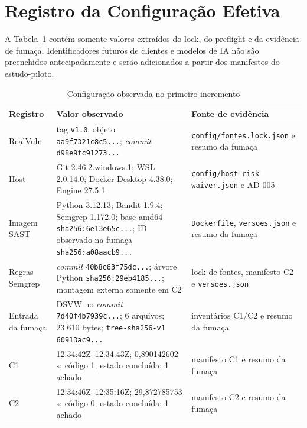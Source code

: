 \section{Registro da Configuração Efetiva}\label{sec:registro-configuracao-desenvolvimento}

A Tabela~\ref{tab:registro-configuracao-efetiva} contém somente valores extraídos do lock, do preflight e da evidência de fumaça. Identificadores futuros de clientes e modelos de IA não são preenchidos antecipadamente e serão adicionados a partir dos manifestos do estudo-piloto.

\begin{table}[htb]
\ABNTEXfontereduzida
\caption{\label{tab:registro-configuracao-efetiva}Configuração observada no primeiro incremento}
\centering
\begin{tabularx}{\textwidth}{|X|X|X|}
\hline
\textbf{Registro} & \textbf{Valor observado} & \textbf{Fonte de evidência} \\
\hline
RealVuln & tag \texttt{v1.0}; objeto \texttt{aa9f7321c8c5...}; \textit{commit} \texttt{d98e9fc91273...} & \texttt{config/fontes.lock.json} e resumo da fumaça \\
\hline
Host & Git 2.46.2.windows.1; WSL 2.0.14.0; Docker Desktop 4.38.0; Engine 27.5.1 & \texttt{config/host-risk-waiver.json} e AD-005 \\
\hline
Imagem SAST & Python 3.12.13; Bandit 1.9.4; Semgrep 1.172.0; base amd64 \texttt{sha256:6e13e65c...}; ID observado na fumaça \texttt{sha256:a08aacb9...} & \texttt{Dockerfile}, \texttt{versoes.json} e resumo da fumaça \\
\hline
Regras Semgrep & \textit{commit} \texttt{40b8c63f75dc...}; árvore Python \texttt{sha256:29eb4185...}; montagem externa somente em C2 & lock de fontes, manifesto C2 e \texttt{versoes.json} \\
\hline
Entrada da fumaça & DSVW no \textit{commit} \texttt{7d40f4b7939c...}; 6 arquivos; 23.610 bytes; \texttt{tree-sha256-v1} \texttt{60913ac9...} & inventários C1/C2 e resumo da fumaça \\
\hline
C1 & 12:34:42Z--12:34:43Z; 0,890142602 s; código 1; estado concluída; 1 achado & manifesto C1 e resumo da fumaça \\
\hline
C2 & 12:34:46Z--12:35:16Z; 29,872785753 s; código 0; estado concluída; 1 achado & manifesto C2 e resumo da fumaça \\
\hline
\end{tabularx}
\end{table}

